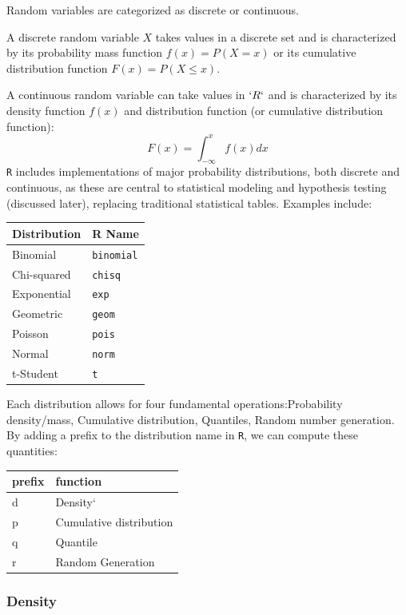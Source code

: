 \documentclass[
]{article}
\begin{document}
Random variables are categorized as discrete or continuous.

A discrete random variable \(X\) takes values in a discrete set and is
characterized by its probability mass function \(f(x) = P(X = x)\) or
its cumulative distribution function \(F(x) = P(X \leq x)\).

A continuous random variable can take values in \(`R`\) and is
characterized by its density function \(f(x)\) and distribution function
(or cumulative distribution function):
\[F(x) = \int_{-\infty}^x f(x) dx\] \texttt{R} includes implementations
of major probability distributions, both discrete and continuous, as
these are central to statistical modeling and hypothesis testing
(discussed later), replacing traditional statistical tables. Examples
include:

\begin{longtable}[]{@{}ll@{}}
\toprule\noalign{}
\textbf{Distribution} & \textbf{R Name} \\
\midrule\noalign{}
\endhead
\bottomrule\noalign{}
\endlastfoot
Binomial & \texttt{binomial} \\
Chi-squared & \texttt{chisq} \\
Exponential & \texttt{exp} \\
Geometric & \texttt{geom} \\
Poisson & \texttt{pois} \\
Normal & \texttt{norm} \\
t-Student & \texttt{t} \\
\end{longtable}

Each distribution allows for four fundamental operations:Probability
density/mass, Cumulative distribution, Quantiles, Random number
generation. By adding a prefix to the distribution name in \texttt{R},
we can compute these quantities:

\begin{longtable}[]{@{}ll@{}}
\toprule\noalign{}
\textbf{prefix} & \textbf{function} \\
\midrule\noalign{}
\endhead
\bottomrule\noalign{}
\endlastfoot
d & Density` \\
p & Cumulative distribution \\
q & Quantile \\
r & Random Generation \\
\end{longtable}

\hypertarget{density}{%
\subsubsection{Density}\label{density}}
\end{document}

